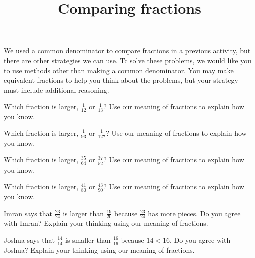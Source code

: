 \documentclass[nooutcomes,noauthor, handout]{ximera}
\title{Comparing fractions}
\begin{document}
\begin{abstract}

\end{abstract}

\maketitle


We used a common denominator to compare fractions in a previous activity, but there are other strategies we can use. To solve these problems, we would like you to use methods other than making a common denominator. You may make equivalent fractions to help you think about the problems, but your strategy must include additional reasoning.

\begin{problem}
Which fraction is larger, $\frac{1}{12}$ or $\frac{1}{13}$? Use our meaning of fractions to explain how you know.
\end{problem}


\begin{problem}
Which fraction is larger, $\frac{1}{93}$ or $\frac{1}{127}$? Use our meaning of fractions to explain how you know.
\end{problem}


\begin{problem}
Which fraction is larger, $\frac{35}{64}$ or $\frac{37}{52}$? Use our meaning of fractions to explain how you know.
\end{problem}



\begin{problem}
Which fraction is larger, $\frac{41}{80}$ or $\frac{43}{90}$? Use our meaning of fractions to explain how you know.
\end{problem}



\begin{problem}

Imran says that $\frac{23}{24}$ is larger than $\frac{19}{20}$ because $\frac{23}{24}$ has more pieces. Do you agree with Imran? Explain your thinking using our meaning of fractions.

\end{problem}


\begin{problem}
Joshua says that $\frac{14}{14}$ is smaller than $\frac{16}{16}$ because $14 < 16$. Do you agree with Joshua? Explain your thinking using our meaning of fractions.
\end{problem}
\end{document}

